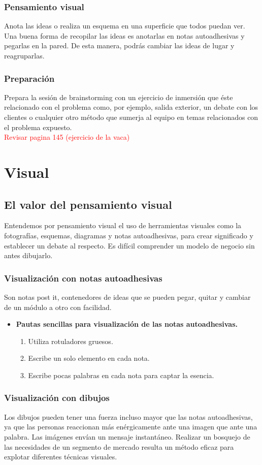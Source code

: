 \documentclass[11pt]{book}
\begin{document}
\subsection{Pensamiento visual}
Anota las ideas o realiza un esquema en una superficie que todos puedan ver. Una buena forma de recopilar las ideas es anotarlas en notas autoadhesivas y pegarlas en la pared. De esta manera, podrás cambiar las ideas de lugar y reagruparlas.
\subsection{Preparación}
Prepara la sesión de brainstorming con un ejercicio de inmersión que éste relacionado con el problema como, por ejemplo, salida exterior, un debate con los clientes o cualquier otro método que sumerja al equipo en temas relacionados con el problema expuesto.\\
\textcolor{red}{Revisar pagina 145 (ejercicio de la vaca)}
\chapter{Visual}
\section{El valor del pensamiento visual}
Entendemos por pensamiento visual el uso de herramientas visuales como la fotografías, esquemas, diagramas y notas autoadhesivas, para crear significado y establecer un debate al respecto.
Es difícil comprender un modelo de negocio sin antes dibujarlo. 
\subsection{Visualización con notas autoadhesivas}
Son notas post it, contenedores de ideas que se pueden pegar, quitar y cambiar de un módulo a otro con facilidad.
\begin{itemize}
\item \textbf{Pautas sencillas para visualización de las notas autoadhesivas.}
\begin{enumerate}
\item Utiliza rotuladores gruesos.
\item Escribe un solo elemento en cada nota.
\item Escribe pocas palabras en cada nota para captar la esencia.
\end{enumerate}
\end{itemize}
\subsection{Visualización con dibujos}
Los dibujos pueden tener una fuerza incluso mayor que las notas autoadhesivas, ya que las personas reaccionan más enérgicamente ante una imagen que ante una palabra. Las imágenes envían un mensaje instantáneo.
Realizar un bosquejo de las necesidades de un segmento de mercado resulta un método eficaz para explotar diferentes técnicas visuales.
\end{document}
